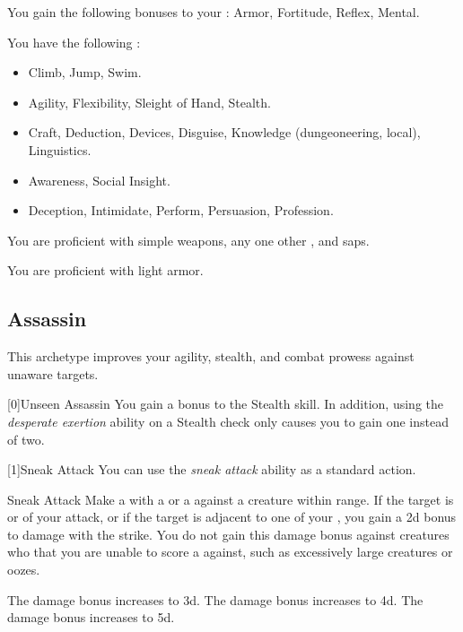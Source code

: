         You gain the following bonuses to your :  Armor,  Fortitude,  Reflex,  Mental.

        You have the following :
        \begin{itemize}
            \item {} Climb, Jump, Swim.
            \item {} Agility, Flexibility, Sleight of Hand, Stealth.
            \item {} Craft, Deduction, Devices, Disguise, Knowledge (dungeoneering, local), Linguistics.
            \item {} Awareness, Social Insight.
            \item {} Deception, Intimidate, Perform, Persuasion, Profession.
        \end{itemize}

        You are proficient with simple weapons, any one other , and saps.

        You are proficient with light armor.

    \newpage
    \subsection{Assassin}
        This archetype improves your agility, stealth, and combat prowess against unaware targets.

        [0]{Unseen Assassin} You gain a  bonus to the Stealth skill.
        In addition, using the \textit{desperate exertion} ability on a Stealth check only causes you to gain one  instead of two.

        [1]{Sneak Attack}
        You can use the \textit{sneak attack} ability as a standard action.
        \begin{freeability}{Sneak Attack}
            Make a  with a  or a  against a creature within \rngshort range.
            If the target is  or  of your attack, or if the target is adjacent to one of your , you gain a \plus2d bonus to damage with the strike.
            You do not gain this damage bonus against creatures who that you are unable to score a  against, such as excessively large creatures or oozes.

            \rankline
             The damage bonus increases to \plus3d.
             The damage bonus increases to \plus4d.
             The damage bonus increases to \plus5d.
        \end{freeability}

